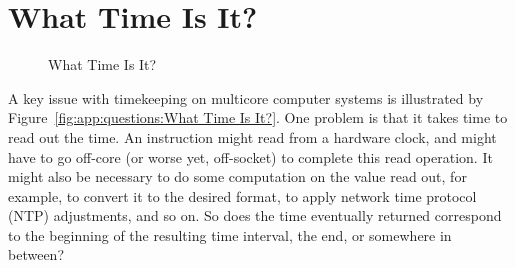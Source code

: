 
\section{What Time Is It?}
\label{sec:app:questions:What Time Is It?}

\begin{figure}[htb]
\begin{center}
\end{center}
\caption{What Time Is It?}
\end{figure}

A key issue with timekeeping on multicore computer systems is illustrated
by Figure~\ref{fig:app:questions:What Time Is It?}.
One problem is that it takes time to read out the time.
An instruction might read from a hardware clock, and might
have to go off-core (or worse yet, off-socket) to complete
this read operation.
It might also be necessary to do some computation on the value read out,
for example, to convert it to the desired format, to apply network time
protocol (NTP) adjustments, and so on.
So does the time eventually returned correspond to the beginning of
the resulting time interval, the end, or somewhere in between?

